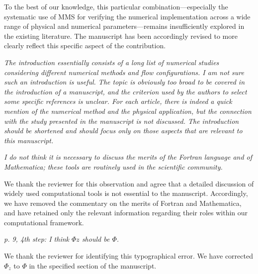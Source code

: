 \documentclass[12pt]{article}
\begin{document}
To the best of our knowledge, this particular combination—especially the systematic use of MMS for verifying the numerical implementation across a wide range of physical and numerical parameters—remains insufficiently explored in the existing literature. The manuscript has been accordingly revised to more clearly reflect this specific aspect of the contribution.
\vspace{3mm}

{\it The introduction essentially consists of a long list of numerical studies considering different numerical methods and flow configurations. I am not sure such an introduction is useful. The topic is obviously too broad to be covered in the introduction of a manuscript, and the criterion used by the authors to select some specific references is unclear. For each article, there is indeed a quick mention of the numerical method and the physical application, but the connection with the study presented in the manuscript is
not discussed. The introduction should be shortened and should focus only on those aspects that are relevant to this manuscript.}

\vspace{3mm}

\vspace{3mm}

{\it I do not think it is necessary to discuss the merits of the Fortran language and of Mathematica; these tools are routinely used in the scientific community.}

\vspace{3mm}
We thank the reviewer for this observation and agree that a detailed discussion of widely used computational tools is not essential to the manuscript. Accordingly, we have removed the commentary on the merits of Fortran and Mathematica, and have retained only the relevant information regarding their roles within our computational framework.
\vspace{3mm}

{\it p. 9, 4th step: I think $\Phi z$ should be $\Phi$.}

\vspace{3mm}
We thank the reviewer for identifying this typographical error. We have corrected $\Phi_z$ to $\Phi$ in the specified section of the manuscript.
\vspace{3mm}
\end{document}
